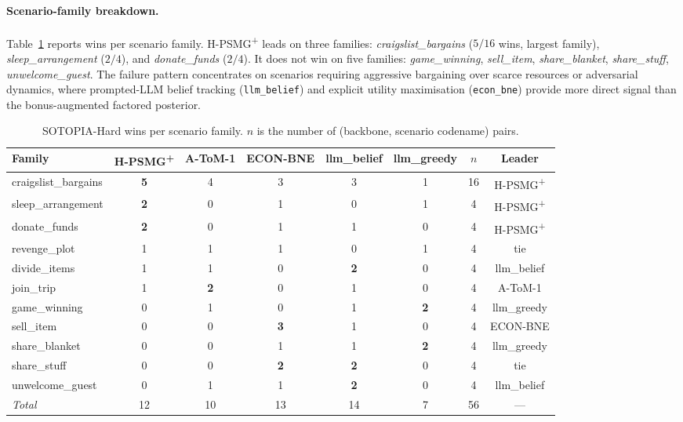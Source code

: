 \paragraph{Scenario-family breakdown.} Table~\ref{tab:sotopia-family} reports wins per scenario family. H-PSMG\textsuperscript{+} leads on three families: \emph{craigslist\_bargains} ($5/16$ wins, largest family), \emph{sleep\_arrangement} ($2/4$), and \emph{donate\_funds} ($2/4$). It does not win on five families: \emph{game\_winning}, \emph{sell\_item}, \emph{share\_blanket}, \emph{share\_stuff}, \emph{unwelcome\_guest}. The failure pattern concentrates on scenarios requiring aggressive bargaining over scarce resources or adversarial dynamics, where prompted-LLM belief tracking (\texttt{llm\_belief}) and explicit utility maximisation (\texttt{econ\_bne}) provide more direct signal than the bonus-augmented factored posterior.

\begin{table}[h]
\centering\small
\caption{SOTOPIA-Hard wins per scenario family. $n$ is the number of (backbone, scenario codename) pairs.}
\label{tab:sotopia-family}
\begin{tabular}{lccccccc}
\toprule
Family & H-PSMG\textsuperscript{+} & A-ToM-1 & ECON-BNE & llm\_belief & llm\_greedy & $n$ & Leader \\
\midrule
craigslist\_bargains & \textbf{5} & 4 & 3 & 3 & 1 & 16 & H-PSMG\textsuperscript{+} \\
sleep\_arrangement & \textbf{2} & 0 & 1 & 0 & 1 & 4 & H-PSMG\textsuperscript{+} \\
donate\_funds & \textbf{2} & 0 & 1 & 1 & 0 & 4 & H-PSMG\textsuperscript{+} \\
revenge\_plot & 1 & 1 & 1 & 0 & 1 & 4 & tie \\
divide\_items & 1 & 1 & 0 & \textbf{2} & 0 & 4 & llm\_belief \\
join\_trip & 1 & \textbf{2} & 0 & 1 & 0 & 4 & A-ToM-1 \\
game\_winning & 0 & 1 & 0 & 1 & \textbf{2} & 4 & llm\_greedy \\
sell\_item & 0 & 0 & \textbf{3} & 1 & 0 & 4 & ECON-BNE \\
share\_blanket & 0 & 0 & 1 & 1 & \textbf{2} & 4 & llm\_greedy \\
share\_stuff & 0 & 0 & \textbf{2} & \textbf{2} & 0 & 4 & tie \\
unwelcome\_guest & 0 & 1 & 1 & \textbf{2} & 0 & 4 & llm\_belief \\
\midrule
\emph{Total} & 12 & 10 & 13 & 14 & 7 & 56 & --- \\
\bottomrule
\end{tabular}
\end{table}

